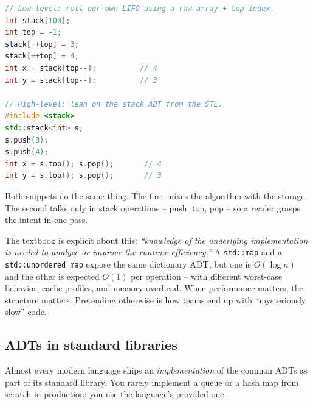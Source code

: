 \documentclass[11pt]{article}
\begin{document}
\begin{examplebox}
\begin{lstlisting}[basicstyle=\ttfamily\small,frame=single,language=C++]
// Low-level: roll our own LIFO using a raw array + top index.
int stack[100];
int top = -1;
stack[++top] = 3;
stack[++top] = 4;
int x = stack[top--];          // 4
int y = stack[top--];          // 3

// High-level: lean on the stack ADT from the STL.
#include <stack>
std::stack<int> s;
s.push(3);
s.push(4);
int x = s.top(); s.pop();       // 4
int y = s.top(); s.pop();       // 3
\end{lstlisting}
Both snippets do the same thing. The first mixes the algorithm with
the storage. The second talks only in stack operations -- push,
top, pop -- so a reader grasps the intent in one pass.
\end{examplebox}

\begin{warnbox}
The textbook is explicit about this: \emph{``knowledge of the
underlying implementation is needed to analyze or improve the
runtime efficiency.''} A \texttt{std::map} and a
\texttt{std::unordered\_map} expose the same dictionary ADT, but one
is $O(\log n)$ and the other is expected $O(1)$ per operation --
with different worst-case behavior, cache profiles, and memory
overhead. When performance matters, the structure matters. Pretending
otherwise is how teams end up with ``mysteriously slow'' code.
\end{warnbox}

\subsection{ADTs in standard libraries}

Almost every modern language ships an \emph{implementation} of the
common ADTs as part of its standard library. You rarely implement a
queue or a hash map from scratch in production; you use the
language's provided one.
\end{document}
